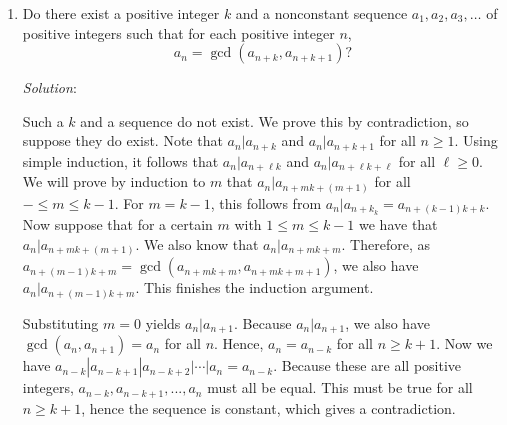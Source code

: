 \documentclass{article}
\begin{document}
\begin{enumerate}[1.]
\item %
Do there exist a positive integer $k$ and a nonconstant sequence $a_1, a_2, a_3, \dotsc$ of positive integers such that for each positive integer $n$,
\[ a_n = \gcd(a_{n+k},a_{n+k+1})? \]

\textit{Solution}:

Such a $k$ and a sequence do not exist.
We prove this by contradiction, so suppose they do exist.
Note that $a_n | a_{n+k}$ and $a_n | a_{n+k+1}$ for all $n \ge 1$.
Using simple induction, it follows that $a_n | a_{n+\ell k}$ and $a_n | a_{n+\ell k+ \ell}$ for all $\ell \ge 0$.
We will prove by induction to $m$ that $ a_n | a_{n+mk+(m+1)}$ for all $- \le m \leq k - 1$.
For $m = k - 1$, this follows from $a_n | a_{n+k_k} =a_{n+(k-1)k+k}$.
Now suppose that for a certain $m$ with $1 \le m \le k - 1$ we have that $a_n | a_{n+mk+(m+1)}$. We also know that $a_n | a_{n+mk+m}$.
Therefore, as $a_{n+(m-1)k+m} = \gcd(a_{n+mk+m}, a_{n+mk+m+1})$, we also have $a_n | a_{n+(m-1)k+m}$.
This finishes the induction argument.

Substituting $m = 0$ yields $a_n | a_{n+1}$.
Because $a_n | a_{n+1}$, we also have $\gcd(a_n, a_{n+1}) = a_n$ for all $n$.
Hence, $a_n = a_{n-k}$ for all $n \ge k + 1$.
Now we have $a_{n-k} | a_{n-k+1} | a_{n-k+2} | \dotsb | a_n = a_{n-k}$.
Because these are all positive integers, $a_{n-k}, a_{n-k+1}, . . . , a_n$ must all be equal.
This must be true for all $n \ge k + 1$, hence the sequence is constant, which gives a contradiction.


\end{enumerate}
\end{document}
